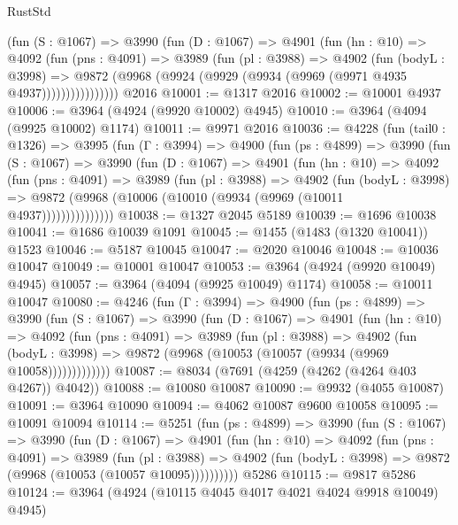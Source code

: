 \begin{lexlean}{RustStd}
\begin{coremodule}
{\begin{coremodule}
{{{{{{{{{{{{{{{{{{{{{{{{{{{{{{{{{{{{{{            (fun (S : @1067) =>
            @3990
              (fun (D : @1067) =>
              @4901
                (fun (hn : @10) =>
                @4092
                  (fun (pns : @4091) =>
                  @3989
                    (fun (pl : @3988) =>
                    @4902
                      (fun (bodyL : @3998) =>
                      @9872 (@9968 (@9924 (@9929 (@9934 (@9969 (@9971 @4935 @4937))))))))))))))))
    @2016
@10001 := @1317 @2016
@10002 := @10001 @4937
@10006 := @3964 (@4924 (@9920 @10002) @4945)
@10010 := @3964 (@4094 (@9925 @10002) @1174)
@10011 := @9971 @2016
@10036 := @4228
    (fun (tail0 : @1326) =>
    @3995
      (fun (Γ : @3994) =>
      @4900
        (fun (ps : @4899) =>
        @3990
          (fun (S : @1067) =>
          @3990
            (fun (D : @1067) =>
            @4901
              (fun (hn : @10) =>
              @4092
                (fun (pns : @4091) =>
                @3989
                  (fun (pl : @3988) =>
                  @4902
                    (fun (bodyL : @3998) =>
                    @9872 (@9968 (@10006 (@10010 (@9934 (@9969 (@10011 @4937)))))))))))))))
@10038 := @1327 @2045 @5189
@10039 := @1696 @10038
@10041 := @1686 @10039 @1091
@10045 := @1455 (@1483 (@1320 @10041)) @1523
@10046 := @5187 @10045
@10047 := @2020 @10046
@10048 := @10036 @10047
@10049 := @10001 @10047
@10053 := @3964 (@4924 (@9920 @10049) @4945)
@10057 := @3964 (@4094 (@9925 @10049) @1174)
@10058 := @10011 @10047
@10080 := @4246
    (fun (Γ : @3994) =>
    @4900
      (fun (ps : @4899) =>
      @3990
        (fun (S : @1067) =>
        @3990
          (fun (D : @1067) =>
          @4901
            (fun (hn : @10) =>
            @4092
              (fun (pns : @4091) =>
              @3989
                (fun (pl : @3988) =>
                @4902
                  (fun (bodyL : @3998) =>
                  @9872 (@9968 (@10053 (@10057 (@9934 (@9969 @10058)))))))))))))
@10087 := @8034 (@7691 (@4259 (@4262 (@4264 @403 @4267)) @4042))
@10088 := @10080 @10087
@10090 := @9932 (@4055 @10087)
@10091 := @3964 @10090
@10094 := @4062 @10087 @9600 @10058
@10095 := @10091 @10094
@10114 := @5251
    (fun (ps : @4899) =>
    @3990
      (fun (S : @1067) =>
      @3990
        (fun (D : @1067) =>
        @4901
          (fun (hn : @10) =>
          @4092
            (fun (pns : @4091) =>
            @3989
              (fun (pl : @3988) =>
              @4902 (fun (bodyL : @3998) => @9872 (@9968 (@10053 (@10057 @10095))))))))))
    @5286
@10115 := @9817 @5286
@10124 := @3964 (@4924 (@10115 @4045 @4017 @4021 @4024 @9918 @10049) @4945)
}}}}}}}}}}}}}}}}}}}}}}}}}}}}}}}}}}}}}}
\end{coremodule}}
\end{coremodule}
\end{lexlean}
